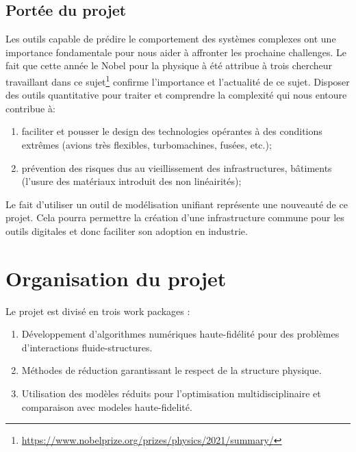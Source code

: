 \documentclass[french]{article}
\begin{document}
\subsection{Portée du projet}

Les outils capable de prédire le comportement des systèmes complexes ont une importance fondamentale pour nous aider à affronter les prochaine challenges. Le fait que cette année le Nobel pour la physique à été attribue à trois chercheur travaillant dans ce sujet\footnote{\url{https://www.nobelprize.org/prizes/physics/2021/summary/}} confirme l'importance et l'actualité de ce sujet. Disposer des outils quantitative pour traiter et comprendre la complexité qui nous entoure contribue à:

\begin{enumerate}
	\item faciliter et pousser le design des technologies opérantes à des conditions extrêmes (avions très flexibles, turbomachines, fusées, etc.);
	\item prévention des risques dus au vieillissement des infrastructures, bâtiments (l'usure des matériaux introduit des non linéairités);
\end{enumerate} 

Le fait d'utiliser un outil de modélisation unifiant représente une nouveauté de ce projet. Cela pourra permettre la création d'une infrastructure commune pour les outils digitales et donc faciliter son adoption en industrie. 


\section{Organisation du projet}
Le projet est divisé en trois work packages :

\begin{enumerate}
	\item Développement d'algorithmes numériques haute-fidélité pour des problèmes d'interactions fluide-structures.
	\item Méthodes de réduction garantissant le respect de la structure physique. 
	\item Utilisation des modèles réduits pour l'optimisation multidisciplinaire et comparaison avec modeles haute-fidelité.
\end{enumerate}
\end{document}
